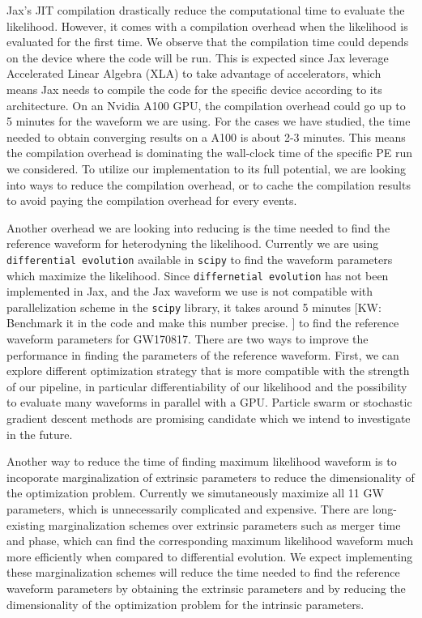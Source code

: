 \documentclass[twocolumn]{aastex631}
\newcommand{\kw}[1]{{\color{rb4}[KW: #1 ]}}
\begin{document}
Jax's JIT compilation drastically reduce the computational time to evaluate the
likelihood. However, it comes with a compilation overhead when the likelihood is
evaluated for the first time. We observe that the compilation time could depends
on the device where the code will be run. This is expected since Jax leverage
Accelerated Linear Algebra (XLA) to take advantage of accelerators, which means
Jax needs to compile the code for the specific device according to its
architecture. On an Nvidia A100 GPU, the compilation overhead could go up to 5
minutes for the waveform we are using. For the cases we have studied, the time
needed to obtain converging results on a A100 is about 2-3 minutes. This means
the compilation overhead is dominating the wall-clock time of the specific PE
run we considered. To utilize our implementation to its full potential, we are
looking into ways to reduce the compilation overhead, or to cache the
compilation results to avoid paying the compilation overhead for every events.


Another overhead we are looking into reducing is the time needed to find the
reference waveform for heterodyning the likelihood. Currently we are using
\texttt{differential evolution} available in \texttt{scipy} to find the waveform
parameters which maximize the likelihood. Since \texttt{differnetial evolution}
has not been implemented in Jax, and the Jax waveform we use is not compatible
with parallelization scheme in the \texttt{scipy} library, it takes around 5
minutes \kw{Benchmark it in the code and make this number precise.} to find the
reference waveform parameters for GW170817. There are two ways to improve the
performance in finding the parameters of the reference waveform. First, we can
explore different optimization strategy that is more compatible with the
strength of our pipeline, in particular differentiability of our likelihood and
the possibility to evaluate many waveforms in parallel with a GPU. Particle
swarm or stochastic gradient descent methods are promising candidate which we
intend to investigate in the future. 

Another way to reduce the time of finding maximum likelihood waveform is to
incoporate marginalization of extrinsic parameters to reduce the dimensionality
of the optimization problem. Currently we simutaneously maximize all 11 GW
parameters, which is unnecessarily complicated and expensive. There are
long-existing marginalization schemes over extrinsic parameters such as merger
time and phase, which can find the corresponding maximum likelihood waveform
much more efficiently when compared to differential evolution. We expect
implementing these marginalization schemes will reduce the time needed to find
the reference waveform parameters by obtaining the extrinsic parameters and by
reducing the dimensionality of the optimization problem for the intrinsic
parameters.
\end{document}
